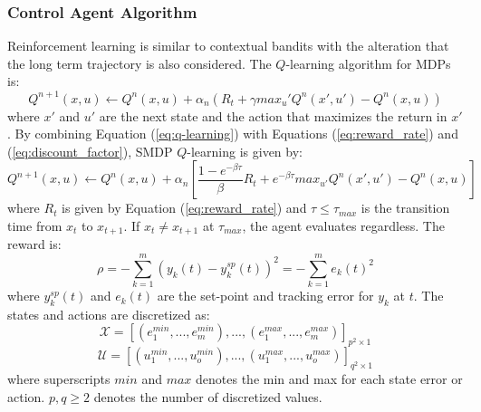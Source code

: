 \subsubsection{Control Agent Algorithm}
Reinforcement learning is similar to contextual bandits with the alteration that the long term trajectory is also considered. The $Q$-learning algorithm for MDPs is:
\begin{equation}
    Q^{n+1}(x, u) \leftarrow Q^n(x, u) + \alpha_n(R_t + \gamma max_u' Q^n(x', u') - Q^n(x, u))
    \label{eq:q-learning}
\end{equation}
where $x'$ and $u'$ are the next state and the action that maximizes the return in $x'$. By combining Equation (\ref{eq:q-learning}) with Equations (\ref{eq:reward_rate}) and (\ref{eq:discount_factor}), SMDP $Q$-learning is given by:
\begin{equation}
    Q^{n+1}(x, u) \leftarrow Q^n(x, u) + \alpha_n \left[\frac{1 - e^{-\beta \tau}}{\beta}R_t + e^{-\beta \tau} max_{u'} Q^n(x', u') - Q^n(x, u) \right]
\label{eq:q-learning-smdp}
\end{equation}
where $R_t$ is given by Equation (\ref{eq:reward_rate}) and $\tau \leq \tau_{max}$ is the transition time from $x_{t}$ to $x_{t+1}$.  If $x_{t} \neq x_{t+1}$ at $\tau_{max}$, the agent evaluates regardless.  The reward is:
\begin{equation}
\rho= - \sum\limits^m_{k=1} (y_{k}(t) - y_{k}^{sp}(t))^2 = - \sum\limits^m_{k=1} e_k(t)^2
\label{eq:mse}
\end{equation}
where $y_{k}^{sp}(t)$ and $e_k(t)$ are the set-point and tracking error for $y_k$ at $t$.  The states and actions are discretized as: 
\begin{equation}
{\mathcal{X}} = [(e_{1}^{min}, ..., e_{m}^{min}), ..., (e_{1}^{max}, ..., e_{m}^{max})]_{p^2 \times 1}
\label{eq:states}
\end{equation}
\begin{equation}
{\mathcal{U}} = [(u_{1}^{min}, ..., u_{o}^{min}), ..., (u_{1}^{max}, ..., u_{o}^{max})]_{q^2 \times 1}
\label{eq:actions}
\end{equation}
where superscripts $min$ and $max$ denotes the min and max for each state error or action. $p, q \geq 2$ denotes the number of discretized values. 

